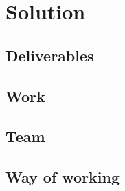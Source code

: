 \section{Solution}

\subsection{Deliverables}

\subsection{Work}

\subsection{Team}

\subsection{Way of working}
